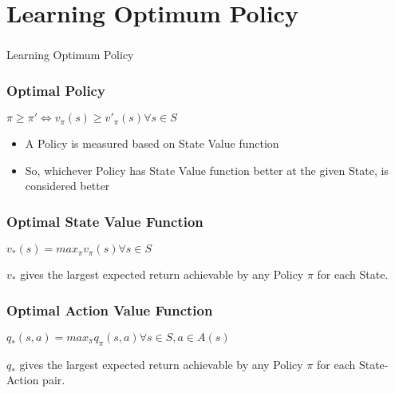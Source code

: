 \section[Opt]{Learning Optimum Policy}

\begin{frame}[fragile]\frametitle{}
\begin{center}
{\Large Learning Optimum Policy}
\end{center}
\end{frame}


\begin{frame}[fragile]\frametitle{Optimal Policy}

$\pi \geq \pi' \iff v_{\pi}(s) \geq {v'}_{\pi}(s) \forall s \in S$

\begin{itemize}
\item A Policy is measured based on State Value function
\item So, whichever Policy has State Value function better at the given State, is considered better
\end{itemize}

\end{frame}

\begin{frame}[fragile]\frametitle{Optimal State Value Function}

$v_{*}(s) = max_{\pi} v_{\pi}(s) \forall s \in S$

$v_{*}$ gives the largest expected return achievable by any Policy $\pi$ for each State.

\end{frame}

\begin{frame}[fragile]\frametitle{Optimal Action Value Function}

$q_{*}(s,a) = max_{\pi} q_{\pi}(s,a) \forall s \in S, a \in A(s)$

$q_{*}$ gives the largest expected return achievable by any Policy $\pi$ for each State-Action pair.

\end{frame}


